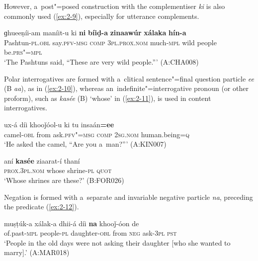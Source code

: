 However, a~post"=posed construction with the complementiser \textit{ki} is also commonly used (\ref{ex:2-9}), especially for utterance complements.

\begin{exe}
\ex
\label{ex:2-9}
\gll ɡhueeṇíi-am maníit-u ki \textbf{ni} \textbf{bíiḍ-a} \textbf{zinaawúr} \textbf{xálaka} \textbf{hín-a}\\
	Pashtun-\textsc{pl.obl} say.\textsc{pfv-msg} \textsc{comp} \textsc{3pl.prox.nom} much-\textsc{mpl} wild people be.\textsc{prs"=mpl} \\
\glt `The Pashtuns said, ``These are very wild people.''' (A:CHA008)
\end{exe}

Polar interrogatives are formed with a~clitical sentence"=final question particle \textit{ee} (B \textit{aa}), as in (\ref{ex:2-10}), whereas an~indefinite"=interrogative pronoun (or other proform), such as \textit{kasée} (B) `whose' in (\ref{ex:2-11}), is used in content interrogatives. 

\begin{exe}
\ex
\label{ex:2-10}
\gll ux-á díi khooǰóol-u ki tu insaán\textbf{=ee}\\
	camel-\textsc{obl} from ask.\textsc{pfv"=msg} \textsc{comp} \textsc{2sg.nom} human.being=\textsc{q} \\
\glt `He asked the camel, ``Are you a~man?''' (A:KIN007)
\end{exe}


\begin{exe}
\ex
\label{ex:2-11}
\gll aní \textbf{kasée} ziaarat-í thaní \\
	\textsc{prox.3pl.nom} whose shrine-\textsc{pl} \textsc{quot} \\
\glt `Whose shrines are these?' (B:FOR026)
\end{exe}

Negation is formed with a~separate and invariable negative particle \textit{na}, preceding the predicate (\ref{ex:2-12}).

\begin{exe}
\ex
\label{ex:2-12}
\gll muṣṭúk-a xálak-a dhii-á díi \textbf{na} khooǰ-óon de \\
	of.past-\textsc{mpl} people-\textsc{pl} daughter-\textsc{obl} from \textsc{neg} ask-\textsc{3pl} \textsc{pst} \\
\glt `People in the old days were not asking their daughter [who she wanted to marry].' (A:MAR018)
\end{exe}
